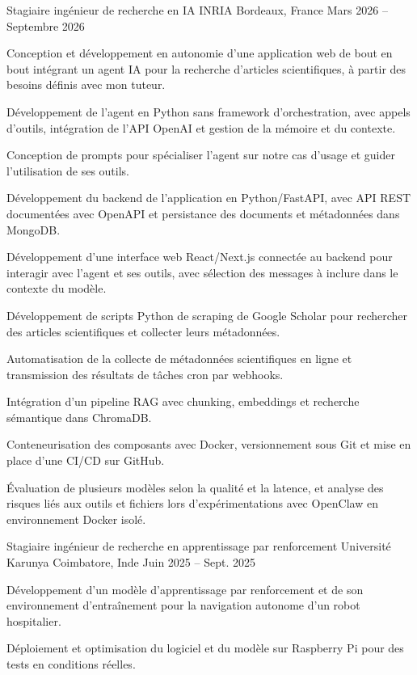 
\begin{cventries}
  \cventry
    {Stagiaire ingénieur de recherche en IA}
    {INRIA}
    {Bordeaux, France}
    {Mars 2026 -- Septembre 2026}
    {
      \begin{cvitems}
        \item {Conception et développement en autonomie d’une application web de bout en bout intégrant un agent IA pour la recherche d’articles scientifiques, à partir des besoins définis avec mon tuteur.}
        \item {Développement de l’agent en Python sans framework d’orchestration, avec appels d’outils, intégration de l’API OpenAI et gestion de la mémoire et du contexte.}
        \item {Conception de prompts pour spécialiser l’agent sur notre cas d’usage et guider l’utilisation de ses outils.}
        \item {Développement du backend de l’application en Python/FastAPI, avec API REST documentées avec OpenAPI et persistance des documents et métadonnées dans MongoDB.}
        \item {Développement d’une interface web React/Next.js connectée au backend pour interagir avec l’agent et ses outils, avec sélection des messages à inclure dans le contexte du modèle.}
        \item {Développement de scripts Python de scraping de Google Scholar pour rechercher des articles scientifiques et collecter leurs métadonnées.}
        \item {Automatisation de la collecte de métadonnées scientifiques en ligne et transmission des résultats de tâches cron par webhooks.}
        \item {Intégration d’un pipeline RAG avec chunking, embeddings et recherche sémantique dans ChromaDB.}
        \item {Conteneurisation des composants avec Docker, versionnement sous Git et mise en place d’une CI/CD sur GitHub.}
        \item {Évaluation de plusieurs modèles selon la qualité et la latence, et analyse des risques liés aux outils et fichiers lors d’expérimentations avec OpenClaw en environnement Docker isolé.}
      \end{cvitems}
    }

  \cventry
    {Stagiaire ingénieur de recherche en apprentissage par renforcement}
    {Université Karunya}
    {Coimbatore, Inde}
    {Juin 2025 -- Sept. 2025}
    {
      \begin{cvitems}
        \item {Développement d’un modèle d’apprentissage par renforcement et de son environnement d’entraînement pour la navigation autonome d’un robot hospitalier.}
        \item {Déploiement et optimisation du logiciel et du modèle sur Raspberry Pi pour des tests en conditions réelles.}
      \end{cvitems}
    }
\end{cventries}
